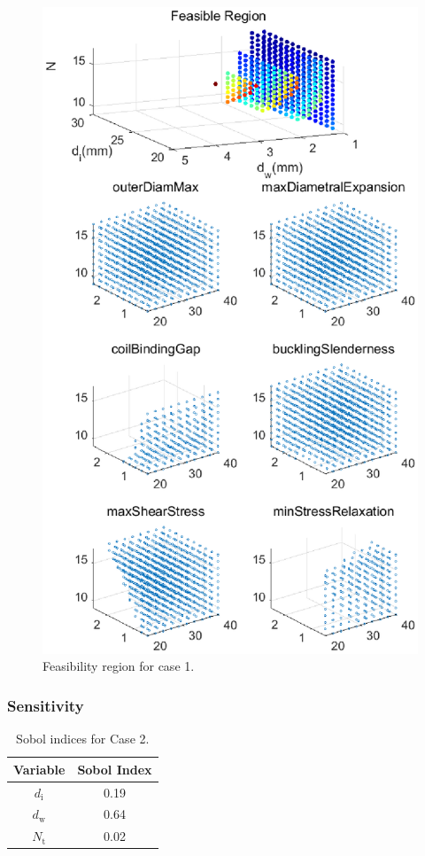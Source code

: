 \documentclass[10pt]{article}
\begin{document}
			\begin{figure}[H]
		 \begin{center}\includegraphics[scale=.5]{Case_56_34891011new.eps}\end{center}
		 \caption{Feasibility region for case 1.}
		 \label{Feasibility region for case 1.}
		 \end{figure}
		 
\subsubsection{Sensitivity}		
\vspace{-.4in}
	\begin{table}[H]
	\caption{Sobol indices for Case 2.}
	\centering
		 \begin{tabular}{ c c}
			 \hline \hline
	 		Variable & Sobol Index\\
			\hline
	 		 $d_{\text{i}}$ & 0.19 \\
			 $d_{\text{w}}$ & 0.64  \\
			 $N_{\text{t}}$ & 0.02 \\ 
			\hline \hline
		 \end{tabular}
	\end{table}
\end{document}
